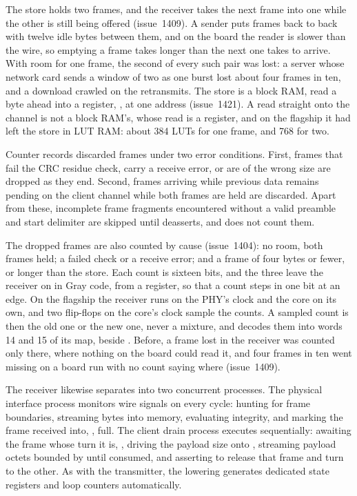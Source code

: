\documentclass[journal,9pt]{IEEEtran}
\begin{document}
The store holds two frames, and the receiver takes the next frame into
one while the other is still being offered (issue~1409).
A sender puts frames back to back with twelve idle bytes between them,
and on the board the reader is slower than the wire, so emptying a
frame takes longer than the next one takes to arrive.
With room for one frame, the second of every such pair was lost: a
server whose network card sends a window of two as one burst lost
about four frames in ten, and a download crawled on the retransmits.
The store is a block RAM, read a byte ahead into a register,
, at one address (issue~1421).
A read straight onto the channel is not a block RAM's, whose read is a
register, and on the flagship it had left the store in LUT RAM: about
384 LUTs for one frame, and 768 for two.

Counter  records discarded frames under two error
conditions. First, frames that fail the CRC residue check, carry a
receive error, or are of the wrong size are dropped as they end.
Second, frames arriving while previous data remains pending
on the client channel while both frames are held are discarded. Apart
from these, incomplete frame fragments encountered without a valid
preamble and start delimiter are skipped until  deasserts,
and  does not count them.

The dropped frames are also counted by cause (issue~1404): no room, both
frames held; a failed check or a receive error; and a frame of four bytes
or fewer, or longer than the store.
Each count is sixteen bits, and the three leave the receiver on
 in Gray code, from a register, so that a count steps
in one bit at an edge.
On the flagship the receiver runs on the PHY's clock and the core on its
own, and two flip-flops on the core's clock sample the counts.
A sampled count is then the old one or the new one, never a mixture,
and  decodes them into words 14 and 15 of its map,
beside .
Before, a frame lost in the receiver was counted only there, where
nothing on the board could read it, and four frames in ten went missing
on a board run with no count saying where (issue~1409).

The receiver likewise separates into two concurrent processes. The
physical interface process monitors wire signals on every cycle: hunting
for frame boundaries, streaming bytes into memory, evaluating integrity,
and marking the frame received into, , full. The client
drain process executes sequentially: awaiting the frame whose turn it
is, , driving the payload size onto ,
streaming payload octets bounded by  until consumed,
and asserting  to release that frame and turn to the
other. As with the transmitter, the lowering generates dedicated state
registers and loop counters automatically.
\end{document}
